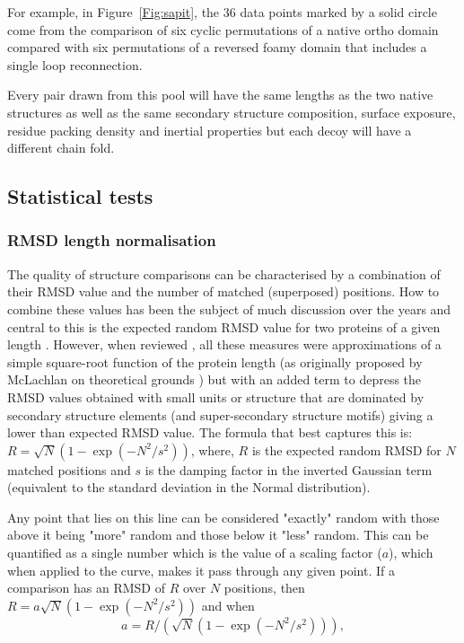 \documentclass[preprint,12pt]{elsarticle}
\newcommand{\Fig}[1]{Figure~\ref{Fig:#1}}
\begin{document}
For example, in \Fig{sapit}, the 36 data
points marked by a solid circle come from the comparison of six cyclic permutations of a
native ortho domain compared with six permutations of a reversed foamy domain that includes
a single loop reconnection.

Every pair drawn from this pool will have the same lengths as the two native structures
as well as the same secondary structure composition, surface exposure, residue packing
density and inertial properties but each decoy will have a different chain fold.


\subsection{Statistical tests}

\subsubsection{RMSD length normalisation}

The quality of structure comparisons can be characterised by a combination of their
RMSD value and the number of matched (superposed) positions.  How to combine these values has
been the subject of much discussion over the years and central to this is the expected random
RMSD value for two proteins of a given length \cite{McLachlanAD84,CohenFEet80d,MaiorovVNet94}.   However,
when reviewed \cite{TaylorWR06a}, all these measures were approximations of a simple square-root function of
the protein length (as originally proposed by McLachlan on theoretical grounds \cite{McLachlanAD84})
but with an added term to depress the RMSD values obtained with small units or structure
that are dominated by secondary structure elements (and super-secondary structure motifs)
giving a lower than expected RMSD value.   The formula that best captures this is:
$R = \surd N (1-\exp(-N^2/s^2))$,
where,
$R$ is the expected random RMSD for $N$ matched positions and $s$ is the damping factor in the inverted
Gaussian term (equivalent to the standard deviation in the Normal distribution).

Any point that lies on this line can be considered "exactly" random
with those above it being "more" random and those below it "less" random.  This can be quantified
as a single number which is the value of a scaling factor ($a$), which when applied to the curve, makes it
pass through any given point.   If a comparison has an RMSD of $R$ over $N$ positions, then
$R = a\surd N (1-\exp(-N^2/s^2))$ and when
\begin{equation}
\label{Eqn:fit}
a = R/(\surd N (1-\exp(-N^2/s^2))), 
\end{equation}
\end{document}
